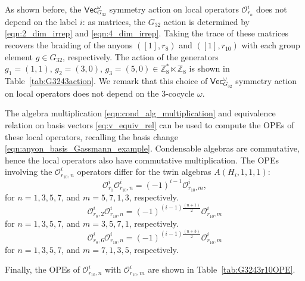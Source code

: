 \documentclass[aps,twocolumn,prx,floatfix,preprintnumbers, nofootinbib,10pt]{revtex4-2}
\numberwithin{equation}{section}
\theoremstyle{definition}
\newcommand{\be}{\begin{equation}}
\newcommand{\ee}{\end{equation}}
\newcommand{\Z}{{\mathbb Z}}
\newcommand{\cO}{\mathcal{O}}
\renewcommand{\Vec}{\mathsf{Vec}}
\begin{document}
As shown before, the $\Vec_{G_{32}}^\omega$ symmetry action on local operators $\cO^i_{r_{n}}$ does not depend on the label $i$: as matrices, the $G_{32}$ action is determined by \eqref{eqn:2_dim_irrep} and \eqref{eqn:4_dim_irrep}. Taking the trace of these matrices recovers the braiding of the anyons $([1],r_8)$ and $([1],r_{10})$ with each group element $g\in G_{32}$, respectively. The action of the generators $g_1=(1,1), \, g_2=(3,0),\, g_3=(5,0)\in \Z_8^* \ltimes \Z_8$ is shown in Table~\ref{tab:G3243action}.  We remark that this choice of $\Vec_{G_{32}}^\omega$ symmetry action on local operators does not depend on the 3-cocycle $\omega$. 



The algebra multiplication \eqref{eqn:cond_alg_multiplication} and equivalence relation on basis vectors \eqref{eq:v_equiv_rel} can be used to compute the OPEs of these local operators, recalling the basis change  \eqref{eqn:anyon_basis_Gassmann_example}. Condensable algebras are commutative, hence the local operators also have commutative multiplication. The OPEs involving the $\cO^i_{r_{10},n}$ operators differ for the twin algebras $A(H_i,1,1,1)$:
\be
    \cO^i_{r_1} \cO^i_{r_{10},n} = (-1)^{i-1} \cO^i_{r_{10},m},
\ee
for $n=1,3,5,7$, and $m=5,7,1,3$, respectively.
\be
    \cO^i_{r_8, 2} \cO^i_{r_{10},n} = (-1)^{(i-1)\frac{(n+1)}{2}}\cO^i_{r_{10},m}
\ee
for $n=1,3,5,7$, and $m=3,5,7,1$, respectively.
\be
    \cO^i_{r_8, 6} \cO^i_{r_{10},n} = (-1)^{(i-1)\frac{(n+3)}{2}}\cO^i_{r_{10},m}
\ee
for $n=1,3,5,7$, and $m=7,1,3,5$, respectively.

Finally, the OPEs of $\cO^i_{r_{10},n}$ with $\cO^i_{r_{10},m}$ are shown in Table~\ref{tab:G3243r10OPE}.
\end{document}
